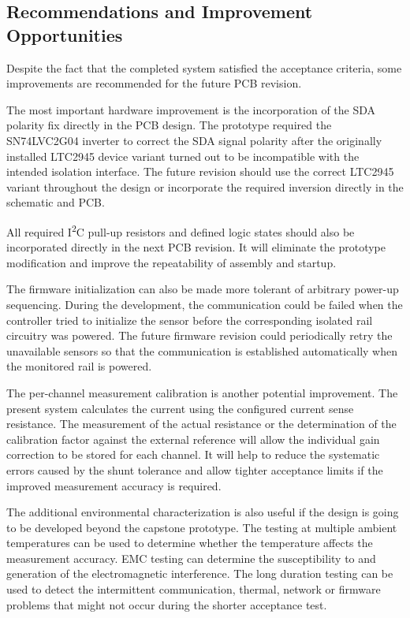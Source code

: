\subsection{Recommendations and Improvement Opportunities}

Despite the fact that the completed system satisfied the acceptance criteria, some improvements are recommended for the future PCB revision.

The most important hardware improvement is the incorporation of the SDA polarity fix directly in the PCB design. The prototype required the SN74LVC2G04 inverter to correct the SDA signal polarity after the originally installed LTC2945 device variant turned out to be incompatible with the intended isolation interface. The future revision should use the correct LTC2945 variant throughout the design or incorporate the required inversion directly in the schematic and PCB.

All required I\textsuperscript{2}C pull-up resistors and defined logic states should also be incorporated directly in the next PCB revision. It will eliminate the prototype modification and improve the repeatability of assembly and startup.

The firmware initialization can also be made more tolerant of arbitrary power-up sequencing. During the development, the communication could be failed when the controller tried to initialize the sensor before the corresponding isolated rail circuitry was powered. The future firmware revision could periodically retry the unavailable sensors so that the communication is established automatically when the monitored rail is powered.

The per-channel measurement calibration is another potential improvement. The present system calculates the current using the configured current sense resistance. The measurement of the actual resistance or the determination of the calibration factor against the external reference will allow the individual gain correction to be stored for each channel. It will help to reduce the systematic errors caused by the shunt tolerance and allow tighter acceptance limits if the improved measurement accuracy is required.

The additional environmental characterization is also useful if the design is going to be developed beyond the capstone prototype. The testing at multiple ambient temperatures can be used to determine whether the temperature affects the measurement accuracy. EMC testing can determine the susceptibility to and generation of the electromagnetic interference. The long duration testing can be used to detect the intermittent communication, thermal, network or firmware problems that might not occur during the shorter acceptance test.

